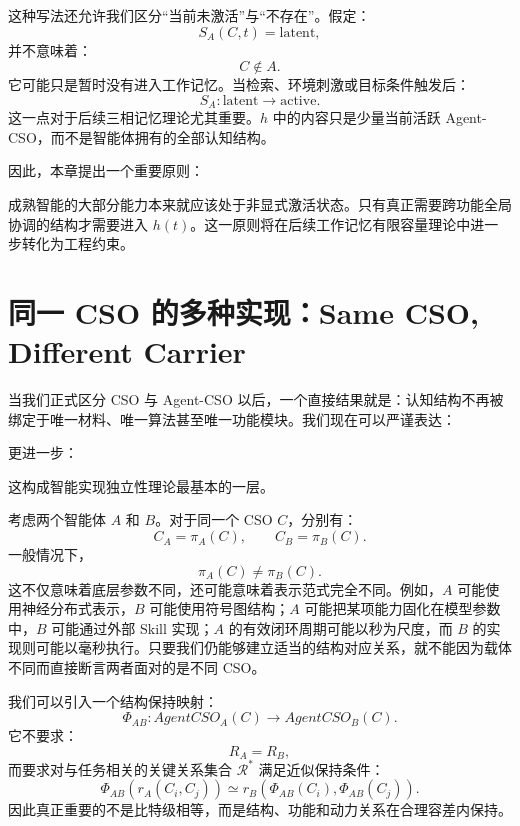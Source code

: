 这种写法还允许我们区分“当前未激活”与“不存在”。假定：
\[
S_A(C,t)=\text{latent},
\]
并不意味着：
\[
C\notin A.
\]
它可能只是暂时没有进入工作记忆。当检索、环境刺激或目标条件触发后：
\[
S_A:
\text{latent}
\rightarrow
\text{active}.
\]
这一点对于后续三相记忆理论尤其重要。$h$ 中的内容只是少量当前活跃 Agent-CSO，而不是智能体拥有的全部认知结构。

因此，本章提出一个重要原则：
\begin{statementbox}
\centering
{}
\end{statementbox}
成熟智能的大部分能力本来就应该处于非显式激活状态。只有真正需要跨功能全局协调的结构才需要进入 $h(t)$。这一原则将在后续工作记忆有限容量理论中进一步转化为工程约束。

\section{同一 CSO 的多种实现：Same CSO, Different Carrier}

当我们正式区分 CSO 与 Agent-CSO 以后，一个直接结果就是：认知结构不再被绑定于唯一材料、唯一算法甚至唯一功能模块。我们现在可以严谨表达：
\begin{statementbox}
\centering
{}
\end{statementbox}
更进一步：
\begin{statementbox}
\centering
{}
\end{statementbox}
这构成智能实现独立性理论最基本的一层。

考虑两个智能体 $A$ 和 $B$。对于同一个 CSO $C$，分别有：
\[
C_A=\pi_A(C),
\qquad
C_B=\pi_B(C).
\]
一般情况下，
\[
\pi_A(C)\neq\pi_B(C).
\]
这不仅意味着底层参数不同，还可能意味着表示范式完全不同。例如，$A$ 可能使用神经分布式表示，$B$ 可能使用符号图结构；$A$ 可能把某项能力固化在模型参数中，$B$ 可能通过外部 Skill 实现；$A$ 的有效闭环周期可能以秒为尺度，而 $B$ 的实现则可能以毫秒执行。只要我们仍能够建立适当的结构对应关系，就不能因为载体不同而直接断言两者面对的是不同 CSO。

我们可以引入一个结构保持映射：
\[
\Phi_{AB}:
AgentCSO_A(C)
\rightarrow
AgentCSO_B(C).
\]
它不要求：
\[
R_A=R_B,
\]
而要求对与任务相关的关键关系集合 $\mathcal R^\ast$ 满足近似保持条件：
\[
\Phi_{AB}
\left(
r_A(C_i,C_j)
\right)
\simeq
r_B
\left(
\Phi_{AB}(C_i),
\Phi_{AB}(C_j)
\right).
\]
因此真正重要的不是比特级相等，而是结构、功能和动力关系在合理容差内保持。

